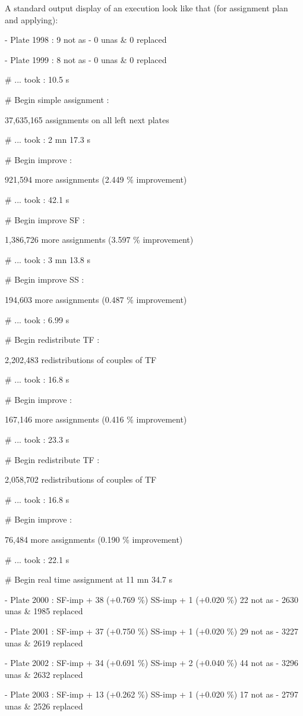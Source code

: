 \documentclass{extarticle}
\begin{document}
A standard output display of an execution look like that (for assignment plan and applying):
{\tt \small 

 - Plate 1998 :      9 not as -     0 unas \&    0 replaced

 - Plate 1999 :      8 not as -     0 unas \&    0 replaced

\# ... took : 10.5 s

\# Begin simple assignment :

  37,635,165 assignments on all left next plates

\# ... took : 2 mn 17.3 s

\# Begin improve :

  921,594 more assignments (2.449 \% improvement)

\# ... took : 42.1 s

\# Begin improve SF :

  1,386,726 more assignments (3.597 \% improvement)

\# ... took : 3 mn 13.8 s

\# Begin improve SS :

  194,603 more assignments (0.487 \% improvement)

\# ... took : 6.99 s

\# Begin redistribute TF :

  2,202,483 redistributions of couples of TF

\# ... took : 16.8 s

\# Begin improve :

  167,146 more assignments (0.416 \% improvement)

\# ... took : 23.3 s

\# Begin redistribute TF :

  2,058,702 redistributions of couples of TF

\# ... took : 16.8 s

\# Begin improve :

  76,484 more assignments (0.190 \% improvement)

\# ... took : 22.1 s

\# Begin real time assignment at 11 mn 34.7 s

 - Plate 2000 : SF-imp + 38 (+0.769 \%) SS-imp +  1 (+0.020 \%)    22 not as -  2630 unas \& 1985 replaced

 - Plate 2001 : SF-imp + 37 (+0.750 \%) SS-imp +  1 (+0.020 \%)    29 not as -  3227 unas \& 2619 replaced

 - Plate 2002 : SF-imp + 34 (+0.691 \%) SS-imp +  2 (+0.040 \%)    44 not as -  3296 unas \& 2632 replaced

 - Plate 2003 : SF-imp + 13 (+0.262 \%) SS-imp +  1 (+0.020 \%)    17 not as -  2797 unas \& 2526 replaced
}
\end{document}
